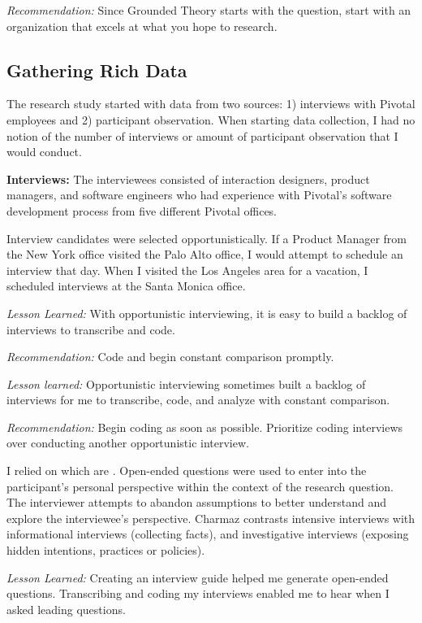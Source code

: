 \textit{Recommendation:} Since Grounded Theory starts with the question,  start with an organization that excels at what you hope to research.
\subsection{Gathering Rich Data}
The research study started with data from two sources: 1) interviews with Pivotal employees and 2) participant observation. When starting data collection, I had no notion of the number of interviews or amount of participant observation that I would conduct. 

\textbf{Interviews:} The interviewees consisted of interaction designers, product managers, and software engineers who had experience with Pivotal's software development process from five different Pivotal offices. 

Interview candidates were selected opportunistically. If a Product Manager from the New York office visited the Palo Alto office, I would attempt to schedule an interview that day. When I visited the Los Angeles area for a vacation, I scheduled interviews at the Santa Monica office. 

\textit{Lesson Learned:} With opportunistic interviewing, it is easy to build a backlog of interviews to transcribe and code. 

\textit{Recommendation:} Code and begin constant comparison promptly.

\textit{Lesson learned:} Opportunistic interviewing sometimes built a backlog of interviews for me to transcribe, code, and analyze with constant comparison. 

\textit{Recommendation:} Begin coding as soon as possible. Prioritize coding interviews over conducting another opportunistic interview. 

I relied on  which are  \cite{Charmaz}. Open-ended questions were used to enter into the participant's personal perspective within the context of the research question. The interviewer attempts to abandon assumptions to better understand and explore the interviewee's perspective. Charmaz \cite{Charmaz} contrasts intensive interviews with informational interviews (collecting facts), and investigative interviews (exposing hidden intentions, practices or policies).

\textit{Lesson Learned:} Creating an interview guide helped me generate open-ended questions. Transcribing and coding my interviews enabled me to hear when I asked leading questions.

